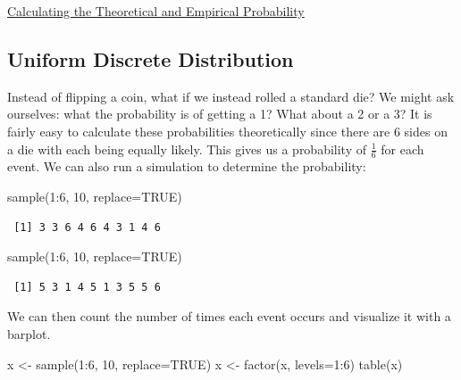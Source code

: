 \documentclass[
  letterpaper,
  DIV=11,
  numbers=noendperiod]{scrreprt}
\newenvironment{Shaded}{\begin{snugshade}}{\end{snugshade}}
\newcommand{\AttributeTok}[1]{\textcolor[rgb]{0.40,0.45,0.13}{#1}}
\newcommand{\ConstantTok}[1]{\textcolor[rgb]{0.56,0.35,0.01}{#1}}
\newcommand{\DecValTok}[1]{\textcolor[rgb]{0.68,0.00,0.00}{#1}}
\newcommand{\FunctionTok}[1]{\textcolor[rgb]{0.28,0.35,0.67}{#1}}
\newcommand{\NormalTok}[1]{\textcolor[rgb]{0.00,0.23,0.31}{#1}}
\newcommand{\OtherTok}[1]{\textcolor[rgb]{0.00,0.23,0.31}{#1}}
\newcommand{\SpecialCharTok}[1]{\textcolor[rgb]{0.37,0.37,0.37}{#1}}
\begin{document}
\begin{watch}{}{}
    \href{https://youtu.be/SDBW7QNa6HA}{Calculating the Theoretical and Empirical Probability}
\end{watch}

\subsection{Uniform Discrete
Distribution}\label{uniform-discrete-distribution}

Instead of flipping a coin, what if we instead rolled a standard die? We
might ask ourselves: what the probability is of getting a 1? What about
a 2 or a 3? It is fairly easy to calculate these probabilities
theoretically since there are 6 sides on a die with each being equally
likely. This gives us a probability of \(\frac{1}{6}\) for each event.
We can also run a simulation to determine the probability:

\begin{Shaded}
\begin{Highlighting}[]
\FunctionTok{sample}\NormalTok{(}\DecValTok{1}\SpecialCharTok{:}\DecValTok{6}\NormalTok{, }\DecValTok{10}\NormalTok{, }\AttributeTok{replace=}\ConstantTok{TRUE}\NormalTok{)}
\end{Highlighting}
\end{Shaded}

\begin{verbatim}
 [1] 3 3 6 4 6 4 3 1 4 6
\end{verbatim}

\begin{Shaded}
\begin{Highlighting}[]
\FunctionTok{sample}\NormalTok{(}\DecValTok{1}\SpecialCharTok{:}\DecValTok{6}\NormalTok{, }\DecValTok{10}\NormalTok{, }\AttributeTok{replace=}\ConstantTok{TRUE}\NormalTok{)}
\end{Highlighting}
\end{Shaded}

\begin{verbatim}
 [1] 5 3 1 4 5 1 3 5 5 6
\end{verbatim}

We can then count the number of times each event occurs and visualize it
with a barplot.

\begin{Shaded}
\begin{Highlighting}[]
\NormalTok{x }\OtherTok{\textless{}{-}} \FunctionTok{sample}\NormalTok{(}\DecValTok{1}\SpecialCharTok{:}\DecValTok{6}\NormalTok{, }\DecValTok{10}\NormalTok{, }\AttributeTok{replace=}\ConstantTok{TRUE}\NormalTok{)}
\NormalTok{x }\OtherTok{\textless{}{-}} \FunctionTok{factor}\NormalTok{(x, }\AttributeTok{levels=}\DecValTok{1}\SpecialCharTok{:}\DecValTok{6}\NormalTok{)}
\FunctionTok{table}\NormalTok{(x)}
\end{Highlighting}
\end{Shaded}
\end{document}
